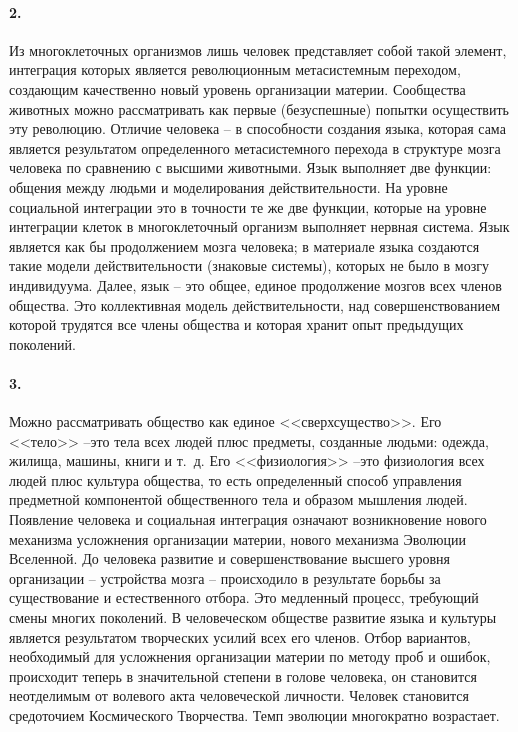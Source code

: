 \documentclass{book}
\begin{document}
\paragraph{2.} Из многоклеточных организмов лишь человек представляет собой такой элемент, интеграция которых является революционным метасистемным переходом, создающим качественно новый уровень организации материи. Сообщества животных можно рассматривать как первые (безуспешные) попытки осуществить эту революцию. Отличие человека -- в способности создания языка, которая сама является результатом определенного метасистемного перехода в структуре мозга человека по сравнению с высшими животными. Язык выполняет две функции: общения между людьми и моделирования действительности. На уровне социальной интеграции это в точности те же две функции, которые на уровне интеграции клеток в многоклеточный организм выполняет нервная система. Язык является как бы продолжением мозга человека; в материале языка создаются такие модели действительности (знаковые системы), которых не было в мозгу индивидуума. Далее, язык -- это общее, единое продолжение мозгов всех членов общества. Это коллективная модель действительности, над 
совершенствованием которой трудятся все члены общества и которая хранит опыт предыдущих поколений.

\paragraph{3.} Можно рассматривать общество как единое <<сверхсущество>>. Его <<тело>> --это тела всех людей плюс предметы, созданные людьми: одежда, жилища, машины, книги и т.~д. Его <<физиология>> --это физиология всех людей плюс культура  общества, то есть определенный способ управления предметной компонентой общественного тела и образом мышления людей. Появление человека и социальная интеграция означают возникновение нового механизма усложнения организации материи, нового механизма Эволюции Вселенной. До человека развитие и совершенствование высшего уровня организации -- устройства мозга -- происходило в результате борьбы за существование и естественного отбора. Это медленный процесс, требующий смены многих поколений. В человеческом обществе развитие языка и культуры является результатом творческих усилий всех его членов. Отбор вариантов, необходимый для усложнения организации материи по методу проб и ошибок, происходит теперь в значительной степени в голове человека, он становится неотделимым от 
волевого 
акта человеческой личности. Человек становится средоточием Космического Творчества. Темп эволюции многократно возрастает.
\end{document}
